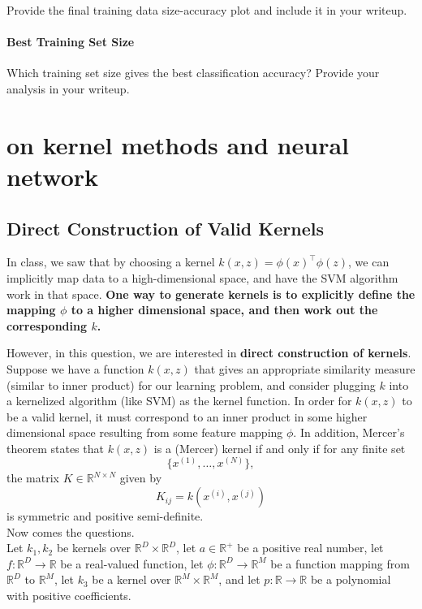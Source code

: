 \documentclass[lang=cn,11pt]{elegantbook}
\begin{document}
Provide the final training data size-accuracy plot and include it in your writeup.

\subsubsection{Best Training Set Size}

Which training set size gives the best classification accuracy? Provide your analysis in your writeup.





\chapter{on kernel methods and neural network}


\section{Direct Construction of Valid Kernels}

In class, we saw that by choosing a kernel $k(x, z) = \phi(x)^\top \phi(z)$, we can implicitly map data to a high-dimensional space, and have the SVM algorithm work in that space. \textbf{One way to generate kernels is to explicitly define the mapping $\phi$ to a higher dimensional space, and then work out the corresponding $k$.}

However, in this question, we are interested in \textbf{direct construction of kernels}. Suppose we have a function $k(x, z)$ that gives an appropriate similarity measure (similar to inner product) for our learning problem, and consider plugging $k$ into a kernelized algorithm (like SVM) as the kernel function. In order for $k(x, z)$ to be a valid kernel, it must correspond to an inner product in some higher dimensional space resulting from some feature mapping $\phi$. In addition, Mercer's theorem states that $k(x, z)$ is a (Mercer) kernel if and only if for any finite set
\[
 \{ x^{(1)}, \dots, x^{(N)} \},
\]
the matrix $K \in \mathbb{R}^{N \times N}$ given by
\[
 K_{ij} = k(x^{(i)}, x^{(j)})
\]
is symmetric and positive semi-definite.\\

Now comes the questions.\\
Let $k_1, k_2$ be kernels over $\mathbb{R}^D \times \mathbb{R}^D$, let $a \in \mathbb{R}^+$ be a positive real number, let $f : \mathbb{R}^D \to \mathbb{R}$ be a real-valued function, let $\phi : \mathbb{R}^D \to \mathbb{R}^M$ be a function mapping from $\mathbb{R}^D$ to $\mathbb{R}^M$, let $k_3$ be a kernel over $\mathbb{R}^M \times \mathbb{R}^M$, and let $p : \mathbb{R} \to \mathbb{R}$ be a polynomial with positive coefficients.
\end{document}
